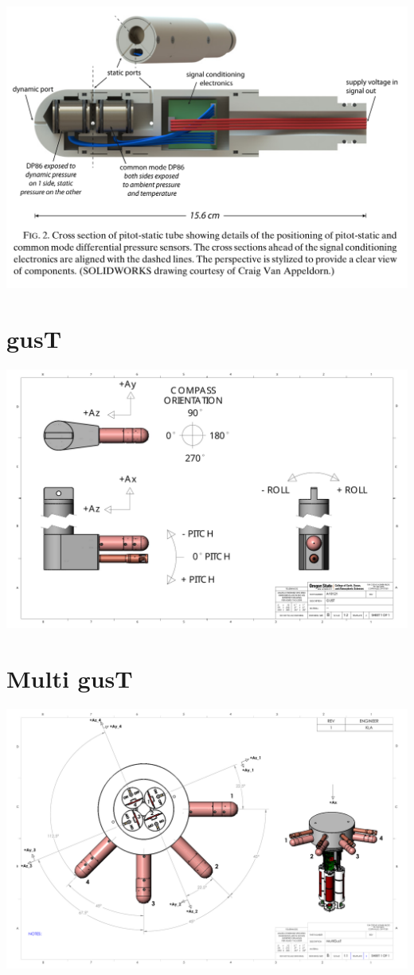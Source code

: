 {\centering
\includegraphics[width=\textwidth]{figs/pitot-cross-section.png}
}
\section{gusT}

\includegraphics[width=\textwidth]{figs/gooseneck-gust-sensor-orienatation.pdf}

\section{Multi gusT}

\includegraphics[width=\textwidth]{figs/multigust-sensor-orientation.pdf}
